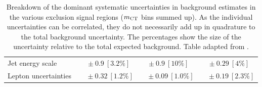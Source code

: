 \begin{table}
\begin{center}
{\begin{tabular*}{\textwidth}{lccc}
Jet energy scale         & $~~~\pm 0.9\ [3.2\%] $          & $~\pm 0.9\ [10\%] $          & $~\pm 0.29\ [4\%] $       \\
Lepton uncertainties         & $~~~~~\pm 0.32\ [1.2\%] $          & $~~~~\pm 0.09\ [1.0\%] $          & $~~~~\pm 0.19\ [2.3\%] $   \\
\bottomrule
\end{tabular*}}
\end{center}
\caption[Breakdown of uncertainty in background estimates]{
Breakdown of the dominant systematic uncertainties in background estimates in the various exclusion signal regions ($m_{\textrm{CT}}$ bins summed up).
As the individual uncertainties can be correlated, they do not necessarily add up in quadrature to 
the total background uncertainty. The percentages show the size of the uncertainty relative to the total expected background. Table adapted from \cite{SUSY-2019-08}.}
\label{tab:systematics_summary}
\end{table}




